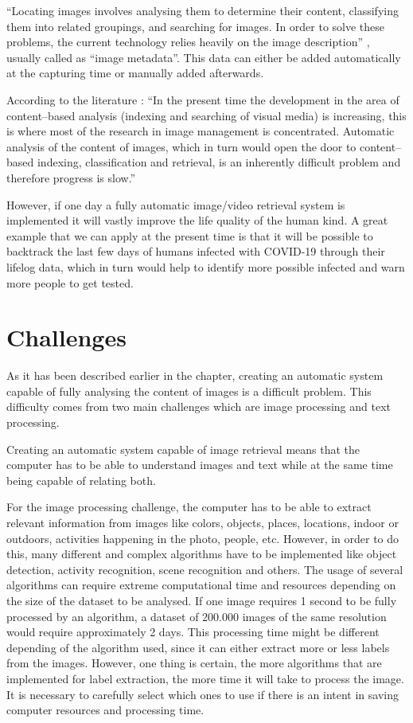 ``Locating images involves analysing them to determine their content, classifying them into related groupings, and searching for  images. In order to solve these problems, the current technology relies heavily on the image description'' \cite{Zhang2008}, usually called as ``image metadata''. This data can either be added automatically at the capturing time or manually added afterwards.

According to the literature \cite{Zhang2008}: ``In the present time the development in the area of content–based analysis (indexing and searching of visual media) is increasing, this is where most of the research in image management is concentrated. Automatic analysis of the content of images, which in turn would open the door to content–based indexing, classification and retrieval, is an inherently difficult problem and therefore progress is slow.''

However, if one day a fully automatic image/video retrieval system is implemented it will vastly improve the life quality of the human kind. A great example that we can apply at the present time is that it will be possible to backtrack the last few days of humans infected with COVID-19 through their lifelog data, which in turn would help to identify more possible infected and warn more people to get tested.

\section{Challenges}

As it has been described earlier in the chapter, creating an automatic system capable of fully analysing the content of images is a difficult problem. This difficulty comes from two main challenges which are image processing and text processing. 

Creating an automatic system capable of image retrieval means that the computer has to be able to understand images and text while at the same time being capable of relating both.

For the image processing challenge, the computer has to be able to extract relevant information from images like colors, objects, places, locations, indoor or outdoors, activities happening in the photo, people, etc. However, in order to do this, many different and complex algorithms have to be implemented like object detection, activity recognition, scene recognition and others. The usage of several algorithms can require extreme computational time and resources depending on the size of the dataset to be analysed. If one image requires 1 second to be fully processed by an algorithm, a dataset of 200.000 images of the same resolution would require approximately 2 days. This processing time might be different depending of the algorithm used, since it can either extract more or less labels from the images. However, one thing is certain, the more algorithms that are implemented for label extraction, the more time it will take to process the image. It is necessary to carefully select which ones to use if there is an intent in saving computer resources and processing time.

